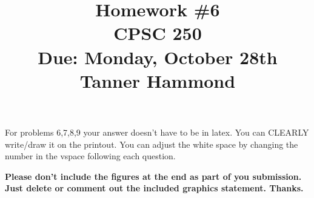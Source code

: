 \documentclass[12pt]{article}
\begin{document}

\title{Homework \#6 \\ CPSC 250 \\ Due: Monday, October 28th \\ Tanner Hammond}%
\date{}

\maketitle

For problems 6,7,8,9 your answer doesn't have to be in latex. You can CLEARLY write/draw it on 
the printout. You can adjust the white space by changing the number in the vspace following each
question.

\noindent
\textbf{Please don't include the figures at the end as part of you submission. Just delete or comment out the included graphics statement. Thanks.}
\end{document}
